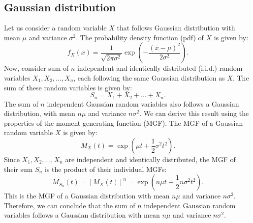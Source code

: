 \documentclass[12pt]{article}
\begin{document}
\begin{singlespace}
\subsection{Gaussian distribution}
Let us consider a random variable $X$ that follows Gaussian distribution with mean $\mu$ and variance $\sigma^2$. The probability density function (pdf) of $X$ is given by:
\[
f_X(x) = \frac{1}{\sqrt{2\pi\sigma^2}} \exp\left(-\frac{(x - \mu)^2}{2\sigma^2}\right).
\]
Now, consider sum of $n$ independent and identically distributed (i.i.d.) random variables $X_1, X_2, ..., X_n$, each following the same Gaussian distribution as $X$. The sum of these random variables is given by:
\[
S_n = X_1 + X_2 + ... + X_n.
\]
The sum of $n$ independent Gaussian random variables also follows a Gaussian distribution, with mean $n\mu$ and variance $n\sigma^2$. We can derive this result using the properties of the moment generating function (MGF). The MGF of a Gaussian random variable $X$ is given by:
\[
M_X(t) = \exp\left(\mu t + \frac{1}{2} \sigma^2 t^2\right).
\]
Since $X_1, X_2, ..., X_n$ are independent and identically distributed, the MGF of their sum $S_n$ is the product of their individual MGFs:
\[
M_{S_n}(t) = [M_X(t)]^n = \exp\left(n\mu t + \frac{1}{2} n\sigma^2 t^2\right).
\]
This is the MGF of a Gaussian distribution with mean $n\mu$ and variance $n\sigma^2$. Therefore, we can conclude that the sum of $n$ independent Gaussian random variables follows a Gaussian distribution with mean $n\mu$ and variance $n\sigma^2$.


\end{singlespace}
\end{document}
